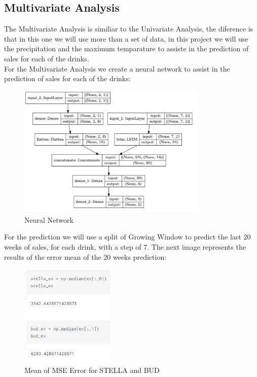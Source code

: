 \newpage
\subsection{Multivariate Analysis}

\quad The Multivariate Analysis is similiar to the Univariate Analysis, the diference is that in this one we will use more than a set of data, in this project we will use the precipitation and the maximum temparature to assiste in the prediction of sales for each of the drinks.\\


For the Multivariate Analysis we create a neural network to assist in the prediction of sales for each of the drinks:

\begin{figure}[H]
    \centering
    \includegraphics[width=0.8\textwidth]{assets/rede neuronal.jpeg}
    \caption{Neural Network}
    \label{fig:neural_network}
    \end{figure}


For the prediction we will use a split of Growing Window to predict the last 20 weeks of sales, for each drink, with a step of 7. The next image represents the results of the error mean of the 20 weeks prediction:\\


\begin{figure}[H]
    \centering
    \includegraphics[width=0.4\textwidth]{assets/erros-previsao.jpeg}
    \caption{Mean of MSE Error for STELLA and BUD}
    \label{fig:notas}
    \end{figure}

